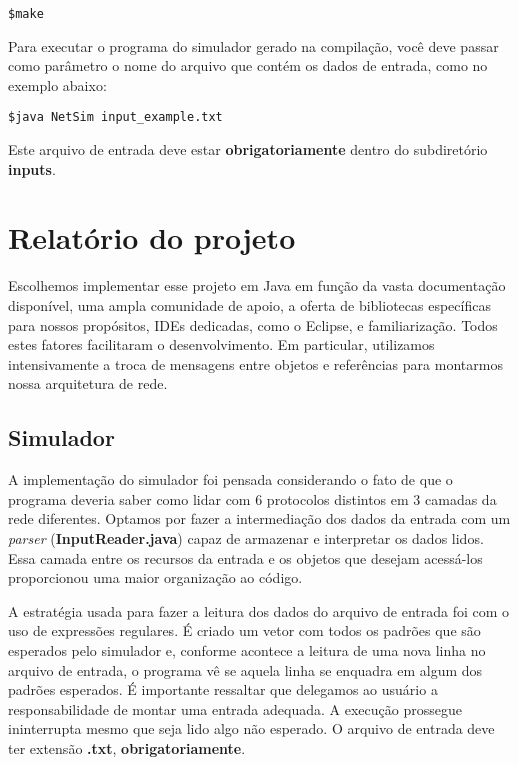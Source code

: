 \documentclass[11pt]{article}
\begin{document}
\color{cyan}
\begin{verbatim}
$make
\end{verbatim}
\color{black}

\noindent Para executar o programa do simulador gerado na compilação, você deve passar como parâmetro o nome do arquivo que contém os dados de entrada, como no exemplo abaixo: 

\color{cyan}
\begin{verbatim}
$java NetSim input_example.txt
\end{verbatim}
\color{black}

\noindent Este arquivo de entrada deve estar \textbf{\textcolor{warning}{obrigatoriamente}} dentro do subdiretório \textbf{inputs}. 

\section{Relatório do projeto}

Escolhemos implementar esse projeto em Java em função da vasta documentação disponível, uma ampla comunidade de apoio, a oferta de bibliotecas específicas para nossos propósitos, IDEs dedicadas, como o Eclipse, e familiarização. Todos estes fatores facilitaram o desenvolvimento. Em particular, utilizamos intensivamente a troca de mensagens entre objetos e referências para montarmos nossa arquitetura de rede.   

\subsection{Simulador}

A implementação do simulador foi pensada considerando o fato de que o programa deveria saber como lidar com 6 protocolos distintos em 3 camadas da rede diferentes. Optamos por fazer a intermediação dos dados da entrada com um \textit{parser} (\textbf{InputReader.java}) capaz de armazenar e interpretar os dados lidos. Essa camada entre os recursos da entrada e os objetos que desejam acessá-los proporcionou uma maior organização ao código.

A estratégia usada para fazer a leitura dos dados do arquivo de entrada foi com o uso de expressões regulares. É criado um vetor com todos os padrões que são esperados pelo simulador e, conforme acontece a leitura de uma nova linha no arquivo de entrada, o programa vê se aquela linha se enquadra em algum dos padrões esperados. É importante ressaltar que delegamos ao usuário a responsabilidade de montar uma entrada adequada. A execução prossegue ininterrupta mesmo que seja lido algo não esperado. O arquivo de entrada deve ter extensão \textbf{.txt}, \textbf{\textcolor{warning}{obrigatoriamente}}.
\end{document}
